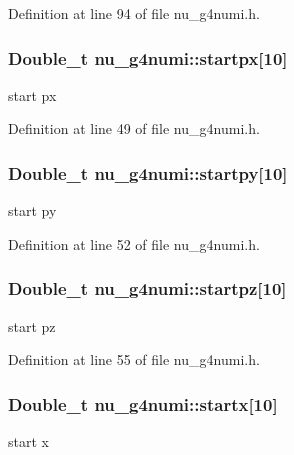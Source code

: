 Definition at line 94 of file nu\-\_\-g4numi.\-h.

\hypertarget{classnu__g4numi_a309ea4b88683c5978593c0d474b1a976}{
\subsubsection[{startpx}]{\setlength{\rightskip}{0pt plus 5cm}Double\-\_\-t nu\-\_\-g4numi\-::startpx\mbox{[}10\mbox{]}}}\label{classnu__g4numi_a309ea4b88683c5978593c0d474b1a976}
start px 

Definition at line 49 of file nu\-\_\-g4numi.\-h.

\hypertarget{classnu__g4numi_a5247e8e73a100a7064f032806f542d38}{
\subsubsection[{startpy}]{\setlength{\rightskip}{0pt plus 5cm}Double\-\_\-t nu\-\_\-g4numi\-::startpy\mbox{[}10\mbox{]}}}\label{classnu__g4numi_a5247e8e73a100a7064f032806f542d38}
start py 

Definition at line 52 of file nu\-\_\-g4numi.\-h.

\hypertarget{classnu__g4numi_a6bec79e4a2effa3cdaa28a1f02ae8124}{
\subsubsection[{startpz}]{\setlength{\rightskip}{0pt plus 5cm}Double\-\_\-t nu\-\_\-g4numi\-::startpz\mbox{[}10\mbox{]}}}\label{classnu__g4numi_a6bec79e4a2effa3cdaa28a1f02ae8124}
start pz 

Definition at line 55 of file nu\-\_\-g4numi.\-h.

\hypertarget{classnu__g4numi_ab9ea407b9c38c0c73b606d9f6f4df80a}{
\subsubsection[{startx}]{\setlength{\rightskip}{0pt plus 5cm}Double\-\_\-t nu\-\_\-g4numi\-::startx\mbox{[}10\mbox{]}}}\label{classnu__g4numi_ab9ea407b9c38c0c73b606d9f6f4df80a}
start x 

